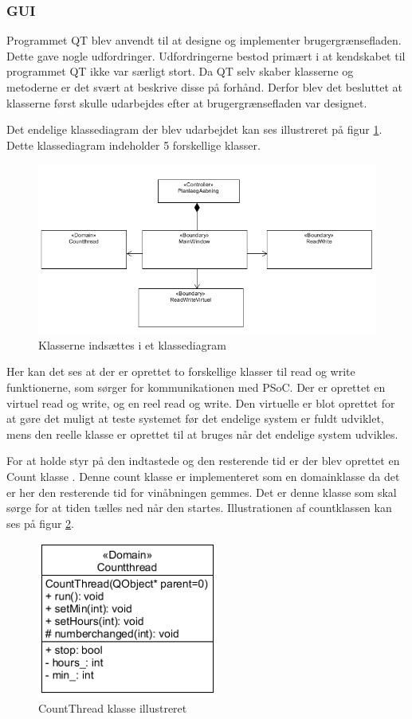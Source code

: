 \subsubsection{GUI}
Programmet QT blev anvendt til at designe og implementer brugergrænsefladen. Dette gave nogle udfordringer. Udfordringerne bestod primært i at kendskabet til programmet QT ikke var særligt stort. Da QT selv skaber klasserne og metoderne er det svært at beskrive disse på forhånd. Derfor blev det besluttet at klasserne først skulle udarbejdes efter at brugergrænsefladen var designet.

Det endelige klassediagram der blev udarbejdet kan ses illustreret på figur \ref{kd}. Dette klassediagram indeholder 5 forskellige klasser.

\begin{figure}[H]
	\centerline{\includegraphics[scale=0.5]{tex/Design/GUI/Fotos/Tom_klassediagram_GUI}}
	\caption{Klasserne indsættes i et klassediagram}
	\label{kd}
\end{figure}

Her kan det ses at der er oprettet to forskellige klasser til read og write funktionerne, som sørger for kommunikationen med PSoC. Der er oprettet en virtuel read og write, og en reel read og write. Den virtuelle er blot oprettet for at gøre det muligt at teste systemet før det endelige system er fuldt udviklet, mens den reelle klasse er oprettet til at bruges når det endelige system udvikles.

For at holde styr på den indtastede og den resterende tid er der blev oprettet en Count klasse . Denne count klasse er implementeret som en domainklasse da det er her den resterende tid for vinåbningen gemmes. Det er denne klasse som skal sørge for at tiden tælles ned når den startes. Illustrationen af countklassen kan ses på figur \ref{CT_CD}.

\begin{figure}[H]
	\centerline{\includegraphics[scale=1]{tex/Design/GUI/Fotos/CountThread}}
	\caption{CountThread klasse illustreret}
	\label{CT_CD}
\end{figure}

